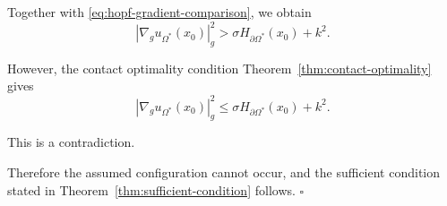 \documentclass{article}
\begin{document}
Together with
\eqref{eq:hopf-gradient-comparison}, we obtain
\begin{equation}
|\nabla_g u_{\Omega^\ast}(x_0)|_g^2
>
\sigma H_{\partial\Omega^\ast}(x_0)+k^2.
\label{eq:strict-optimality-contradiction}
\end{equation}

However, the contact optimality condition
Theorem~\ref{thm:contact-optimality} gives
\begin{equation}
|\nabla_g u_{\Omega^\ast}(x_0)|_g^2
\leq
\sigma H_{\partial\Omega^\ast}(x_0)+k^2.
\end{equation}

This is a contradiction.

Therefore the assumed configuration cannot occur, and the sufficient
condition stated in Theorem~\ref{thm:sufficient-condition} follows.
\hfill$\square$

\end{document}
